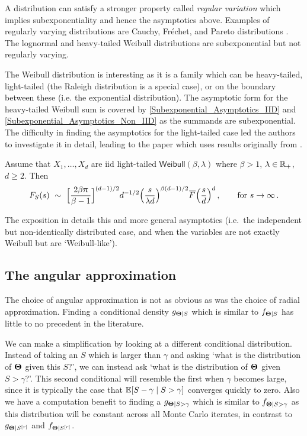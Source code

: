 A distribution can satisfy a stronger property called \emph{regular variation} which implies subexponentiality and hence the asymptotics above. Examples of regularly varying distributions are Cauchy, Fr\'{e}chet, and Pareto distributions \cite{bingham1989regular}. The lognormal and heavy-tailed Weibull distributions are subexponential but not regularly varying.

The Weibull distribution is interesting as it is a family which can be heavy-tailed, light-tailed (the Raleigh distribution is a special case), or on the boundary between these (i.e. the exponential distribution). The asymptotic form for the heavy-tailed Weibull sum is covered by \eqref{Subexponential_Asymptotics_IID} and \eqref{Subexponential_Asymptotics_Non_IID} as the summands are subexponential. The difficulty in finding the asymptotics for the light-tailed case led the authors to investigate it in detail, leading to the paper \cite{asmussen2017tail} which uses results originally from \cite{balkema1993densities}.

\begin{proposition} \label{prop:light_weibull} Assume that $X_1, \dots, X_d$ are iid light-tailed $\mathsf{Weibull}(\beta, \lambda)$ where $\beta>1$, $\lambda \in \mathbb{R}_+$, $d \ge 2$. Then
\begin{equation*}
F_S(s)\ \sim\ \Bigl[ \frac{2\beta\pi}{\beta-1}\Bigr]^{(d-1)/2} d^{-1/2} \Big( \frac{s}{\lambda d} \Big)^{\beta(d-1)/2} \Ftail \Big( \frac{s}{d} \Big)^d \for{s \to \infty}\,.
\end{equation*}
\end{proposition}

The exposition in \cite{asmussen2017tail} details this and more general asymptotics (i.e.\ the independent but non-identically distributed case, and when the variables are not exactly Weibull but are `Weibull-like').

\subsection{The angular approximation}

The choice of angular approximation is not as obvious as was the choice of radial approximation.
Finding a conditional density $g_{\bm{\Theta} \mid S}$ which is similar to $f_{\bm{\Theta} \mid S}$ has little to no precedent in the literature.

We can make a simplification by looking at a different conditional distribution. Instead of taking an $S$ which is larger than $\gamma$ and asking `what is the distribution of $\bm{\Theta}$ given this $S$?', we can instead ask `what is the distribution of $\bm{\Theta}$ given $S > \gamma$?'. This second conditional will resemble the first when $\gamma$ becomes large, since it is typically the case that $\operatorname{{\mathbb E}}[ S-\gamma \mid S > \gamma]$ converges quickly to zero.
Also we have a computation benefit to finding a $g_{\bm{\Theta} \mid S > \gamma}$ which is similar to $f_{\bm{\Theta} \mid S > \gamma}$ as this distribution will be constant across all Monte Carlo iterates, in contrast to $g_{\bm{\Theta} \mid S^{[r]}}$ and $f_{\bm{\Theta} \mid S^{[r]}}$.

